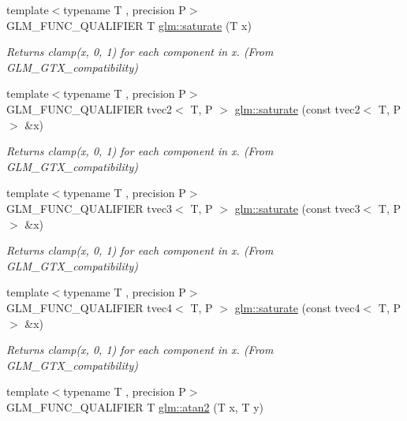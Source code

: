 \begin{DoxyCompactItemize}
{\footnotesize template$<$typename T , precision P$>$ }\\G\+L\+M\+\_\+\+F\+U\+N\+C\+\_\+\+Q\+U\+A\+L\+I\+F\+I\+E\+R T \hyperlink{group__gtx__compatibility_ga0fd09e616d122bc2ed9726682ffd44b7}{glm\+::saturate} (T x)
\begin{DoxyCompactList}\small\item\em Returns clamp(x, 0, 1) for each component in x. (From G\+L\+M\+\_\+\+G\+T\+X\+\_\+compatibility) \end{DoxyCompactList}\item 
{\footnotesize template$<$typename T , precision P$>$ }\\G\+L\+M\+\_\+\+F\+U\+N\+C\+\_\+\+Q\+U\+A\+L\+I\+F\+I\+E\+R tvec2$<$ T, P $>$ \hyperlink{group__gtx__compatibility_ga5815a26488231dfdf92242cf0c2d2107}{glm\+::saturate} (const tvec2$<$ T, P $>$ \&x)
\begin{DoxyCompactList}\small\item\em Returns clamp(x, 0, 1) for each component in x. (From G\+L\+M\+\_\+\+G\+T\+X\+\_\+compatibility) \end{DoxyCompactList}\item 
{\footnotesize template$<$typename T , precision P$>$ }\\G\+L\+M\+\_\+\+F\+U\+N\+C\+\_\+\+Q\+U\+A\+L\+I\+F\+I\+E\+R tvec3$<$ T, P $>$ \hyperlink{group__gtx__compatibility_ga02ed1a53c6df104d56b69f8fb5e9af1b}{glm\+::saturate} (const tvec3$<$ T, P $>$ \&x)
\begin{DoxyCompactList}\small\item\em Returns clamp(x, 0, 1) for each component in x. (From G\+L\+M\+\_\+\+G\+T\+X\+\_\+compatibility) \end{DoxyCompactList}\item 
{\footnotesize template$<$typename T , precision P$>$ }\\G\+L\+M\+\_\+\+F\+U\+N\+C\+\_\+\+Q\+U\+A\+L\+I\+F\+I\+E\+R tvec4$<$ T, P $>$ \hyperlink{group__gtx__compatibility_ga63791409bdef9745b956406afe3157f1}{glm\+::saturate} (const tvec4$<$ T, P $>$ \&x)
\begin{DoxyCompactList}\small\item\em Returns clamp(x, 0, 1) for each component in x. (From G\+L\+M\+\_\+\+G\+T\+X\+\_\+compatibility) \end{DoxyCompactList}\item 
{\footnotesize template$<$typename T , precision P$>$ }\\G\+L\+M\+\_\+\+F\+U\+N\+C\+\_\+\+Q\+U\+A\+L\+I\+F\+I\+E\+R T \hyperlink{group__gtx__compatibility_gac63011205bf6d0be82589dc56dd26708}{glm\+::atan2} (T x, T y)

\end{DoxyCompactItemize}

